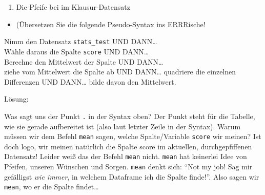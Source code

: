 \documentclass[12pt,ngerman,]{book}
\makeatletter
\newenvironment{Shaded}{\begin{snugshade}}{\end{snugshade}}
\newcommand{\KeywordTok}[1]{\textcolor[rgb]{0.13,0.29,0.53}{\textbf{#1}}}
\newcommand{\DataTypeTok}[1]{\textcolor[rgb]{0.13,0.29,0.53}{#1}}
\newcommand{\DecValTok}[1]{\textcolor[rgb]{0.00,0.00,0.81}{#1}}
\newcommand{\StringTok}[1]{\textcolor[rgb]{0.31,0.60,0.02}{#1}}
\newcommand{\OperatorTok}[1]{\textcolor[rgb]{0.81,0.36,0.00}{\textbf{#1}}}
\newcommand{\NormalTok}[1]{#1}
\providecommand{\tightlist}{%
  \setlength{\itemsep}{0pt}\setlength{\parskip}{0pt}}
\newenvironment{kframe}{%
\medskip{}
\setlength{\fboxsep}{.8em}
 \def\at@end@of@kframe{}%
 \ifinner\ifhmode%
  \def\at@end@of@kframe{\end{minipage}}%
  \begin{minipage}{\columnwidth}%
 \fi\fi%
 \def\FrameCommand##1{\hskip\@totalleftmargin \hskip-\fboxsep
 \colorbox{shadecolor}{##1}\hskip-\fboxsep
     \hskip-\linewidth \hskip-\@totalleftmargin \hskip\columnwidth}%
 \MakeFramed {\advance\hsize-\width
   \@totalleftmargin\z@ \linewidth\hsize
   \@setminipage}}%
 {\par\unskip\endMakeFramed%
 \at@end@of@kframe}
\renewenvironment{Shaded}{\begin{kframe}}{\end{kframe}}
\theoremstyle{definition}
\theoremstyle{definition}
\theoremstyle{remark}
\let\BeginKnitrBlock\begin \let\EndKnitrBlock\end
\makeatother
\begin{document}
\begin{enumerate}
\def\labelenumi{\arabic{enumi}.}
\setcounter{enumi}{2}
\tightlist
\item
  Die Pfeife bei im Klausur-Datensatz
\end{enumerate}

\begin{itemize}
\tightlist
\item
  (Übersetzen Sie die folgende Pseudo-Syntax ins ERRRische!
\end{itemize}

\BeginKnitrBlock{rmdpseudocode}
Nimm den Datensatz \texttt{stats\_test} UND DANN\ldots{}\\
Wähle daraus die Spalte \texttt{score} UND DANN\ldots{}\\
Berechne den Mittelwert der Spalte UND DANN\ldots{}\\
ziehe vom Mittelwert die Spalte ab UND DANN\ldots{} quadriere die
einzelnen Differenzen UND DANN\ldots{} bilde davon den Mittelwert.
\EndKnitrBlock{rmdpseudocode}

Lösung:

\begin{Shaded}
\end{Shaded}

Was sagt uns der Punkt \texttt{.} in der Syntax oben? Der Punkt steht
für die Tabelle, wie sie gerade aufbereitet ist (also laut letzter Zeile
in der Syntax). Warum müssen wir dem Befehl \texttt{mean} sagen, welche
Spalte/Variable \texttt{score} wir meinen? Ist doch logo, wir meinen
natürlich die Spalte score im aktuellen, durchgepfiffenen Datensatz!
Leider weiß das der Befehl \texttt{mean} nicht. \texttt{mean} hat
keinerlei Idee von Pfeifen, unseren Wünschen und Sorgen. \texttt{mean}
denkt sich: ``Not my job! Sag mir gefälligst \emph{wie immer}, in
welchem Dataframe ich die Spalte finde!''. Also sagen wir \texttt{mean},
wo er die Spalte findet\ldots{}
\end{document}
